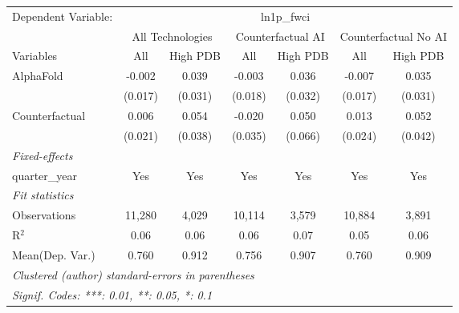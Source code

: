 \begingroup
\centering
\begin{tabular}{lcccccc}
   \tabularnewline \midrule \midrule
   Dependent Variable: & \multicolumn{6}{c}{ln1p\_fwci}\\
 & \multicolumn{2}{c}{All Technologies} & \multicolumn{2}{c}{Counterfactual AI} & \multicolumn{2}{c}{Counterfactual No AI} \\
\cmidrule(lr){1-1}\cmidrule(lr){2-3} \cmidrule(lr){4-5} \cmidrule(lr){6-7}
Variables & \multicolumn{1}{c}{All} & \multicolumn{1}{c}{High PDB} & \multicolumn{1}{c}{All} & \multicolumn{1}{c}{High PDB} & \multicolumn{1}{c}{All} & \multicolumn{1}{c}{High PDB} \\
\cmidrule(lr){1-1}\cmidrule(lr){2-2} \cmidrule(lr){3-3} \cmidrule(lr){4-4} \cmidrule(lr){5-5} \cmidrule(lr){6-6} \cmidrule(lr){7-7}
   AlphaFold      & -0.002  & 0.039   & -0.003  & 0.036   & -0.007  & 0.035\\   
                  & (0.017) & (0.031) & (0.018) & (0.032) & (0.017) & (0.031)\\   
   Counterfactual & 0.006   & 0.054   & -0.020  & 0.050   & 0.013   & 0.052\\   
                  & (0.021) & (0.038) & (0.035) & (0.066) & (0.024) & (0.042)\\   
   \midrule
   \emph{Fixed-effects}\\
   quarter\_year  & Yes     & Yes     & Yes     & Yes     & Yes     & Yes\\  
   \midrule
   \emph{Fit statistics}\\
   Observations   & 11,280  & 4,029   & 10,114  & 3,579   & 10,884  & 3,891\\  
   R$^2$          & 0.06    & 0.06    & 0.06    & 0.07    & 0.05    & 0.06\\  
Mean(Dep. Var.) & 0.760 & 0.912 & 0.756 & 0.907 & 0.760 & 0.909 \\
   \midrule \midrule
   \multicolumn{7}{l}{\emph{Clustered (author) standard-errors in parentheses}}\\
   \multicolumn{7}{l}{\emph{Signif. Codes: ***: 0.01, **: 0.05, *: 0.1}}\\
\end{tabular}
\par\endgroup
